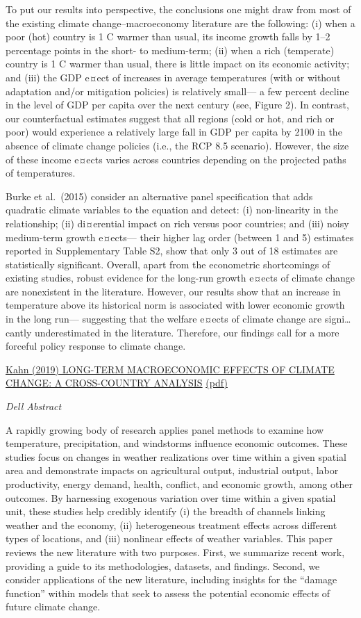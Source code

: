 \documentclass[
]{book}
\begin{document}
To put our results into perspective, the conclusions one might draw from most of the
existing climate change--macroeconomy literature are the following: (i) when a poor (hot)
country is 1 C warmer than usual, its income growth falls by 1--2 percentage points in the
short- to medium-term; (ii) when a rich (temperate) country is 1 C warmer than usual,
there is little impact on its economic activity; and (iii) the GDP e¤ect of increases in average
temperatures (with or without adaptation and/or mitigation policies) is relatively small--- a
few percent decline in the level of GDP per capita over the next century (see, Figure 2).
In contrast, our counterfactual estimates suggest that all regions (cold or hot, and rich or
poor) would experience a relatively large fall in GDP per capita by 2100 in the absence of
climate change policies (i.e., the RCP 8.5 scenario). However, the size of these income e¤ects
varies across countries depending on the projected paths of temperatures.

Burke et al.~(2015) consider an alternative panel specification that
adds quadratic climate variables to the equation
and detect: (i) non-linearity in the relationship; (ii) di¤erential impact on rich versus poor
countries; and (iii) noisy medium-term growth e¤ects--- their higher lag order (between 1
and 5) estimates reported in Supplementary Table S2, show that only 3 out of 18 estimates
are statistically significant. Overall, apart from the econometric shortcomings of existing
studies, robust evidence for the long-run growth e¤ects of climate change are nonexistent in
the literature. However, our results show that an increase in temperature above its historical
norm is associated with lower economic growth in the long run--- suggesting that the welfare
e¤ects of climate change are signi\ldots cantly underestimated in the literature. Therefore, our
findings call for a more forceful policy response to climate change.

\href{https://www.n\%20ber.org/papers/w26167}{Kahn (2019) LONG-TERM MACROECONOMIC EFFECTS OF CLIMATE CHANGE: A CROSS-COUNTRY ANALYSIS}
\href{pdf/Kahn_2019_Macro_Climate.pdf}{(pdf)}

\emph{Dell Abstract}

A rapidly growing body of research applies panel methods to examine how
temperature, precipitation, and windstorms influence economic outcomes. These
studies focus on changes in weather realizations over time within a given spatial area
and demonstrate impacts on agricultural output, industrial output, labor productivity,
energy demand, health, conflict, and economic growth, among other outcomes. By
harnessing exogenous variation over time within a given spatial unit, these studies
help credibly identify (i) the breadth of channels linking weather and the economy, (ii)
heterogeneous treatment effects across different types of locations, and (iii) nonlinear
effects of weather variables. This paper reviews the new literature with two purposes.
First, we summarize recent work, providing a guide to its methodologies, datasets, and
findings. Second, we consider applications of the new literature, including insights for
the ``damage function'' within models that seek to assess the potential economic effects
of future climate change.
\end{document}
